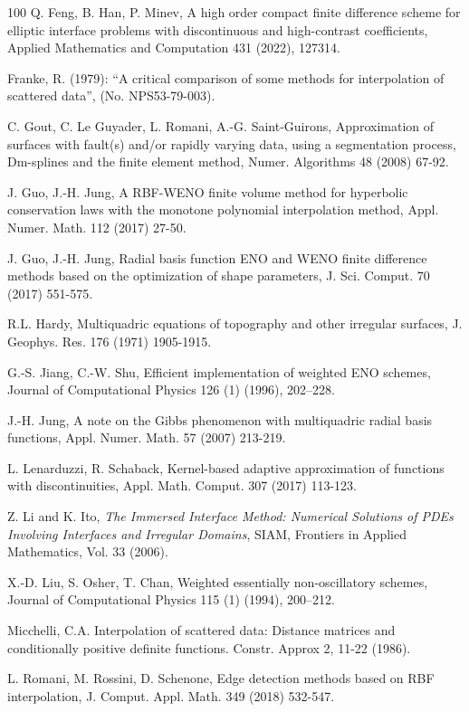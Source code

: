 \documentclass[preprint]{elsarticle}       %
\begin{document}
\begin{thebibliography}{100}
Q. Feng, B. Han, P. Minev, A high order compact finite difference scheme for elliptic interface problems with discontinuous and high-contrast coefficients, Applied Mathematics and Computation 431 (2022), 127314.


  Franke, R. (1979): ``A critical comparison of some methods for interpolation of scattered data'', (No. NPS53-79-003).

 C. Gout, C. Le Guyader, L. Romani, A.-G. Saint-Guirons, Approximation of surfaces with fault(s) and/or rapidly varying data, using a segmentation process, Dm-splines and the finite element method, Numer. Algorithms 48 (2008) 67-92.

 J. Guo, J.-H. Jung, A RBF-WENO finite volume method for hyperbolic conservation laws with the monotone polynomial interpolation method, Appl. Numer. Math. 112 (2017) 27-50.

 J. Guo, J.-H. Jung, Radial basis function ENO and WENO finite difference methods based on the optimization of shape parameters, J. Sci. Comput. 70 (2017) 551-575.

 R.L. Hardy, Multiquadric equations of topography and other irregular surfaces, J. Geophys. Res. 176 (1971) 1905-1915.

G.-S. Jiang, C.-W. Shu, Efficient implementation of weighted ENO schemes, Journal of Computational Physics 126 (1) (1996), 202--228.

 J.-H. Jung, A note on the Gibbs phenomenon with multiquadric radial basis functions, Appl. Numer. Math. 57 (2007) 213-219.

 L. Lenarduzzi, R. Schaback, Kernel-based adaptive approximation of functions with discontinuities, Appl. Math. Comput. 307 (2017) 113-123.

 Z. Li and K. Ito, \textit{The Immersed Interface Method: Numerical Solutions of PDEs Involving Interfaces and Irregular Domains}, SIAM, Frontiers in Applied Mathematics, Vol. 33 (2006).

X.-D. Liu, S. Osher, T. Chan, Weighted essentially non-oscillatory schemes, Journal of Computational Physics 115 (1) (1994), 200--212.

 Micchelli, C.A. Interpolation of scattered data: Distance matrices and conditionally positive definite functions. Constr. Approx 2, 11-22 (1986).

 L. Romani, M. Rossini, D. Schenone, Edge detection methods based on RBF interpolation, J. Comput. Appl. Math. 349 (2018) 532-547.


\end{thebibliography}
\end{document}
